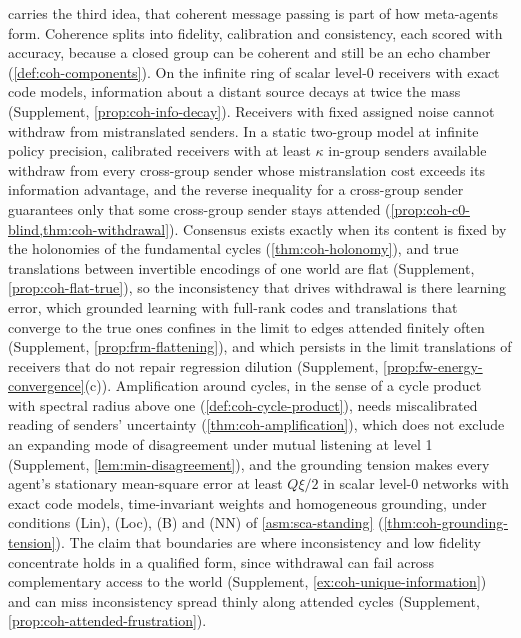  carries the third idea, that coherent message passing is part of how meta-agents form. Coherence splits into fidelity, calibration and consistency, each scored with accuracy, because a closed group can be coherent and still be an echo chamber (\cref{def:coh-components}). On the infinite ring of scalar level-0 receivers with exact code models, information about a distant source decays at twice the mass (Supplement, \cref{prop:coh-info-decay}). Receivers with fixed assigned noise cannot withdraw from mistranslated senders. In a static two-group model at infinite policy precision, calibrated receivers with at least $\kappa$ in-group senders available withdraw from every cross-group sender whose mistranslation cost exceeds its information advantage, and the reverse inequality for a cross-group sender guarantees only that some cross-group sender stays attended (\cref{prop:coh-c0-blind,thm:coh-withdrawal}). Consensus exists exactly when its content is fixed by the holonomies of the fundamental cycles (\cref{thm:coh-holonomy}), and true translations between invertible encodings of one world are flat (Supplement, \cref{prop:coh-flat-true}), so the inconsistency that drives withdrawal is there learning error, which grounded learning with full-rank codes and translations that converge to the true ones confines in the limit to edges attended finitely often (Supplement, \cref{prop:frm-flattening}), and which persists in the limit translations of receivers that do not repair regression dilution (Supplement, \cref{prop:fw-energy-convergence}(c)). Amplification around cycles, in the sense of a cycle product with spectral radius above one (\cref{def:coh-cycle-product}), needs miscalibrated reading of senders' uncertainty (\cref{thm:coh-amplification}), which does not exclude an expanding mode of disagreement under mutual listening at level 1 (Supplement, \cref{lem:min-disagreement}), and the grounding tension makes every agent's stationary mean-square error at least $Q\xi/2$ in scalar level-0 networks with exact code models, time-invariant weights and homogeneous grounding, under conditions (Lin), (Loc), (B) and (NN) of \cref{asm:sca-standing} (\cref{thm:coh-grounding-tension}). The claim that boundaries are where inconsistency and low fidelity concentrate holds in a qualified form, since withdrawal can fail across complementary access to the world (Supplement, \cref{ex:coh-unique-information}) and can miss inconsistency spread thinly along attended cycles (Supplement, \cref{prop:coh-attended-frustration}).

